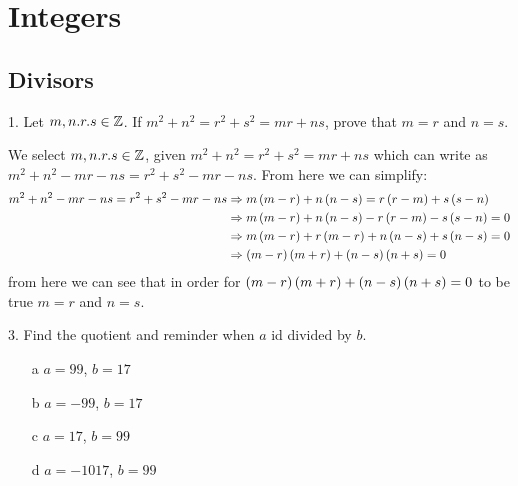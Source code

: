 \section{Integers}  
\subsection{Divisors}
\begin{mdframed}[style=darkQuesion]
1.    Let $m,n.r.s\in \mathbb{Z}$. If $m^2+n^2=r^2+s^2=mr+ns$, prove that $m=r$ and 
$n=s$.
\end{mdframed}

\begin{mdframed}[style=darkAnswer,frametitle={Joe Starr}]
We select $m,n.r.s\in \mathbb{Z}$, given $m^2+n^2=r^2+s^2=mr+ns$ which can write
as $m^2+n^2-mr-ns=r^2+s^2-mr-ns$. From here we can simplify:
\begin{align*}
m^2+n^2-mr-ns=r^2+s^2-mr-ns &\Rightarrow 
m\left(m-r\right)+n\left(n-s\right)=r\left(r-m\right)+s\left(s-n\right) \\
&\Rightarrow m\left(m-r\right)+n\left(n-s\right)-r\left(r-m\right)-s\left(s-n\right)=0 \\
&\Rightarrow m\left(m-r\right)+r\left(m-r\right)+n\left(n-s\right)+s\left(n-s\right)=0 \\
&\Rightarrow \left(m-r\right)\left(m+r\right)+\left(n-s\right)\left(n+s\right)=0 \\
\end{align*}
from here we can see that in order for $\left(m-r\right)\left(m+r\right)+\left(n-s\right)\left(n+s\right)=0$
to be true $m=r$ and $n=s$.
\end{mdframed}
\newpage
\begin{mdframed}[style=darkQuesion]
3.    Find the quotient and reminder when $a$ id divided by $b$. 
\begin{itemize}
    \item [a] {$a=99$, $b=17$}
    \item [b] {$a=-99$, $b=17$}
    \item [c] {$a=17$, $b=99$}
    \item [d] {$a=-1017$, $b=99$}
\end{itemize}

\end{mdframed}

